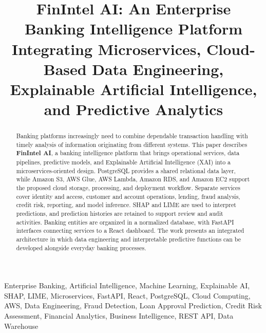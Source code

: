 \documentclass[conference]{IEEEtran}
\begin{document}

\title{
FinIntel AI: An Enterprise Banking Intelligence Platform Integrating
Microservices, Cloud-Based Data Engineering, Explainable Artificial
Intelligence, and Predictive Analytics
}


\author{
}
\maketitle
\begin{abstract}

Banking platforms increasingly need to combine dependable transaction handling with timely analysis of information originating from different systems. This paper describes \textbf{FinIntel AI}, a banking intelligence platform that brings operational services, data pipelines, predictive models, and Explainable Artificial Intelligence (XAI) into a microservices-oriented design. PostgreSQL provides a shared relational data layer, while Amazon S3, AWS Glue, AWS Lambda, Amazon RDS, and Amazon EC2 support the proposed cloud storage, processing, and deployment workflow. Separate services cover identity and access, customer and account operations, lending, fraud analysis, credit risk, reporting, and model inference. SHAP and LIME are used to interpret predictions, and prediction histories are retained to support review and audit activities. Banking entities are organized in a normalized database, with FastAPI interfaces connecting services to a React dashboard. The work presents an integrated architecture in which data engineering and interpretable predictive functions can be developed alongside everyday banking processes.

\end{abstract}
\begin{IEEEkeywords}

Enterprise Banking,
Artificial Intelligence,
Machine Learning,
Explainable AI,
SHAP,
LIME,
Microservices,
FastAPI,
React,
PostgreSQL,
Cloud Computing,
AWS,
Data Engineering,
Fraud Detection,
Loan Approval Prediction,
Credit Risk Assessment,
Financial Analytics,
Business Intelligence,
REST API,
Data Warehouse

\end{IEEEkeywords}
\end{document}
